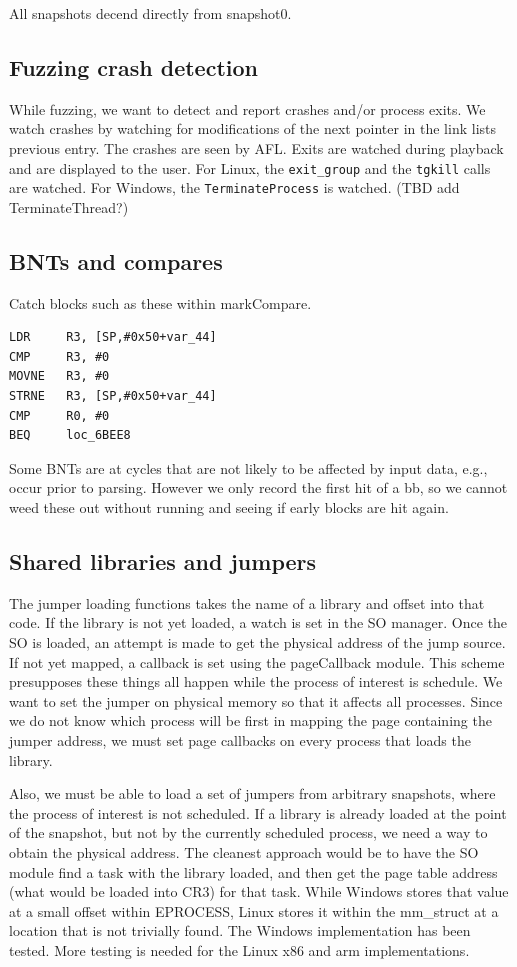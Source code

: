\documentclass[titlepage]{article}
\begin{document}
\begin{appendices}
All snapshots decend directly from snapshot0.

\subsection{Fuzzing crash detection}
While fuzzing, we want to detect and report crashes and/or process exits.
We watch crashes by watching for modifications of the next pointer in the link lists previous entry.
The crashes are seen by AFL.
Exits are watched during playback and are displayed to the user.  For Linux, the {\tt exit\_group} and the
{\tt tgkill} calls are watched.  For Windows, the {\tt TerminateProcess} is watched.  (TBD add TerminateThread?)

\subsection{BNTs and compares}
Catch blocks such as these within markCompare.
\begin{verbatim}
LDR     R3, [SP,#0x50+var_44]
CMP     R3, #0
MOVNE   R3, #0
STRNE   R3, [SP,#0x50+var_44]
CMP     R0, #0
BEQ     loc_6BEE8
\end{verbatim}
Some BNTs are at cycles that are not likely to be affected by input data, e.g., occur prior to parsing.  However we only record the first hit of a bb, so we cannot weed these out without
running and seeing if early blocks are hit again.

\subsection{Shared libraries and jumpers}
The jumper loading functions takes the name of a library and offset into that code.  If the library is not yet loaded, a watch is set in the SO manager.
Once the SO is loaded, an attempt is made to get the physical address of the jump source.  If not yet mapped, a callback is set using the pageCallback module.
This scheme presupposes these things all happen while the process of interest is schedule.   We want to set the jumper on physical memory so that it affects
all processes.  Since we do not know which process will be first in mapping the page containing the jumper address, we must set page callbacks on every process
that loads the library. 

Also, we must be able to load a set of jumpers from arbitrary snapshots, where the process of interest is not scheduled.  If a library is already
loaded at the point of the snapshot, but not by the currently scheduled process, we need a way to obtain the physical address.  The cleanest approach would
be to have the SO module find a task with the library loaded, and then get the page table address (what would be loaded into CR3) for that task.  While 
Windows stores that value at a small offset within EPROCESS, Linux stores it within the mm\_struct at a location that is not trivially found.  The Windows
implementation has been tested.  More testing is needed for the Linux x86 and arm implementations.


\end{appendices}
\end{document}
